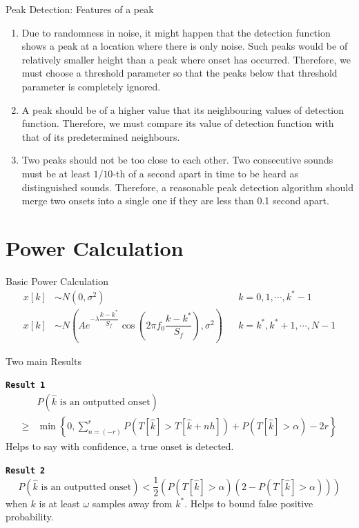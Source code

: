 \documentclass[10pt]{beamer}
\begin{document}
\begin{frame}{Peak Detection: Features of a peak}
    \begin{enumerate}
    \item Due to randomness in noise, it might happen that the detection function shows a peak at a location where there is only noise. Such peaks would be of relatively smaller height than a peak where onset has occurred. Therefore, we must choose a threshold parameter so that the peaks below that threshold parameter is completely ignored.
    \item A peak should be of a higher value that its neighbouring values of detection function. Therefore, we must compare its value of detection function with that of its predetermined neighbours.
    \item Two peaks should not be too close to each other. Two consecutive sounds must be at least $1/10$-th of a second apart in time to be heard as distinguished sounds. Therefore, a reasonable peak detection algorithm should merge two onsets into a single one if they are less than 0.1 second apart.
\end{enumerate}
\end{frame}

\section{Power Calculation}
\begin{frame}{Basic Power Calculation}
    \begin{align*}
 x[k] & \sim N(0, \sigma^2) &&  k=0,1,\cdots, k^*-1\\ 
 x[k] & \sim N\left(Ae^{-\lambda\dfrac{k-k^*}{S_f}}\cos{\left(2\pi f_0\dfrac{k-k^*}{S_f}\right)}, \sigma^2\right) && k=k^*,k^* + 1,\cdots, N-1 
 \end{align*}

\end{frame}


\begin{frame}{Two main Results}

\texttt{\textbf{Result 1}}
\begin{align*}
    & P\left(\hat{k}\text{ is an outputted onset}\right)\\
\geq & \min\left\{0, \sum_{n=(-r)}^{r}P(T[\hat{k}] > T[\hat{k} + nh]) + P(T[\hat{k}] > \alpha) - 2r\right\}
\end{align*}
Helps to say with confidence, a true onset is detected.\\
\vspace*{1cm}

\texttt{\textbf{Result 2}}
$$P\left(\hat{k}\text{ is an outputted onset}\right) < \frac{1}{2}\left( P(T[\hat{k}]>\alpha) (2 - P(T[\hat{k}] > \alpha)) \right)$$
when $k$ is at least $\omega$ samples away from $k^*$. Helps to bound false positive probability.
\end{frame}
\end{document}
